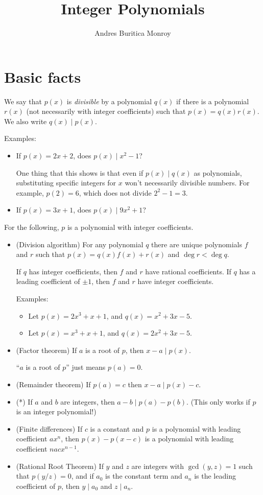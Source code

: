 \documentclass{article}
\title{Integer Polynomials}
\author{Andres Buritica Monroy}
\date{}
\begin{document}
\maketitle
\section{Basic facts}
We say that $p(x)$ is \emph{divisible} by a polynomial $q(x)$ if there is a
polynomial $r(x)$ (not necessarily with integer coefficients) such that
$p(x)=q(x)r(x)$. We also write $q(x)\mid p(x)$.

Examples:
\begin{itemize}
	\item If $p(x)=2x+2$, does $p(x)\mid x^2-1$?

	      One thing that this shows is that even if $p(x)\mid q(x)$ as
	      polynomials, substituting specific integers for $x$ won't necessarily
	      divisible numbers. For example, $p(2)=6$, which does not divide
	      $2^2-1=3$.
	\item If $p(x)=3x+1$, does $p(x)\mid 9x^2+1$?
\end{itemize}
For the following, $p$ is a polynomial with integer coefficients.
\begin{itemize}
	\item (Division algorithm) For any polynomial $q$ there are unique
	      polynomials $f$ and $r$ such that $p(x)=q(x)f(x)+r(x)$ and $\deg r<\deg q$.

	      If $q$ has integer coefficients, then $f$ and $r$ have rational
	      coefficients. If $q$ has a leading coefficient of $\pm 1$, then $f$ and $r$
	      have integer coefficients.

	      Examples:
	      \begin{itemize}
		      \item Let $p(x)=2x^3+x+1$, and $q(x)=x^2+3x-5$.
		      \item Let $p(x)=x^3+x+1$, and $q(x)=2x^2+3x-5$.
	      \end{itemize}
	\item (Factor theorem) If $a$ is a root of $p$, then $x-a\mid p(x)$.

	      ``$a$ is a root of $p$'' just means $p(a)=0$.
	\item (Remainder theorem) If $p(a)=c$ then $x-a\mid p(x)-c$.
	\item (*) If $a$ and $b$ are integers, then $a-b\mid p(a)-p(b)$. (This only
	      works if $p$ is an integer polynomial!)
	\item (Finite differences) If $c$ is a constant and $p$ is a polynomial with
	      leading coefficient $ax^n$, then $p(x)-p(x-c)$ is a polynomial with
	      leading coefficient $nacx^{n-1}$.
	\item (Rational Root Theorem) If $y$ and $z$ are integers with $\gcd(y,z)=1$
	      such that $p(y/z)=0$, and if $a_0$ is the constant term and $a_n$ is
	      the leading coefficient of $p$, then $y\mid a_0$ and $z\mid a_n$.
\end{itemize}
\end{document}
